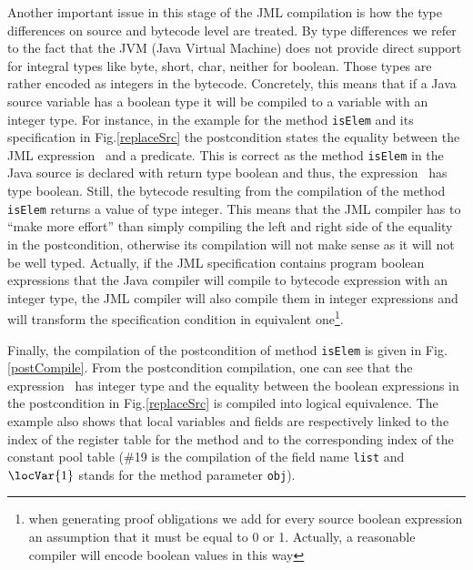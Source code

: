 \begin{enumerate}
Another important issue in this stage of the JML compilation is how the type differences on source and bytecode level are treated. 
By type differences we refer to the fact that the JVM (Java Virtual Machine) does not provide direct support for integral types 
like byte, short, char, neither for boolean. Those types are rather encoded as integers in the bytecode. Concretely, this means that 
if a Java source variable has a boolean type it will be compiled to a variable with
an integer type. For instance, in the example for the method 
\texttt{isElem} and its specification in Fig.\ref{replaceSrc} the postcondition states the equality between the JML expression  
\result \ and a predicate. This is correct as the method \texttt{isElem} in the Java source is declared with return type boolean  and thus,
 the expression \result \ has type boolean. 
Still, the bytecode resulting from the compilation of the method  \texttt{isElem} returns a value of type integer. This means that the JML compiler has to 
``make more effort'' than simply compiling the left and right side of the equality in the postcondition, otherwise its compilation will not make sense as 
it will not be well typed. Actually, if the JML specification contains program boolean expressions that the Java compiler will compile to bytecode expression
 with an integer type, the JML compiler will also compile them in integer expressions and will transform the specification condition in equivalent 
one\footnote{when generating proof obligations we add for every source boolean expression an assumption that it
 must be equal to 0 or 1. Actually, a reasonable compiler will encode boolean values in this way}.  

Finally, the compilation of the postcondition of method \texttt{isElem} is given in Fig. \ref{postCompile}. From the postcondition compilation,
 one can see that the expression \result \ has integer type and the equality between the boolean expressions in the postcondition in Fig.\ref{replaceSrc} is
 compiled into logical equivalence. The example also 
shows that local variables and  fields are respectively linked to the index of the register table for the method and to the corresponding 
index of the constant pool table 
(\#19 is the compilation of the field name \texttt{list} and $\locVar{1}$ stands for the method parameter \texttt{obj}). 


\end{enumerate}
